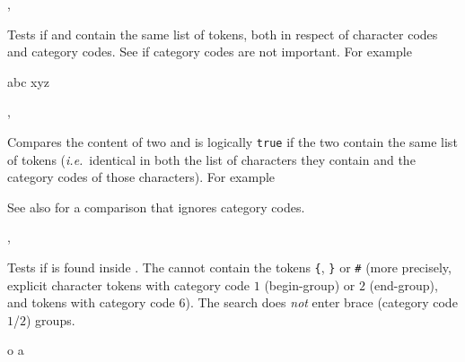 \documentclass[oneside]{book}
\begin{document}
\begin{function}{\TlIfEq,\TlIfEqTF}
\begin{syntax}
  
    
\end{syntax}
Tests if  and  contain the
same list of tokens, both in respect of character codes and category
codes. See  if category codes are not important.
For example
\begin{demohigh}
 {abc} {} {}
 {xyz} {} {}
\end{demohigh}
\end{function}

\begin{function}{\TlVarIfEq,\TlVarIfEqTF}
\begin{syntax}
  
    
\end{syntax}
Compares the content of two  and
is logically \texttt{true} if the two contain the same list of
tokens (\emph{i.e.}~identical in both the list of characters they
contain and the category codes of those characters). For example
\begin{demohigh}
\TlSet {}
\TlSet {}
\TlSet {}
\TlVarIfEqTF \lTmpaTl {} {}
\TlVarIfEqTF \lTmpaTl {} {}
\end{demohigh}
See also  for a comparison that ignores category codes.
\end{function}

\begin{function}{\TlIfIn,\TlIfInTF}
\begin{syntax}
  
    
\end{syntax}
Tests if  is found inside .
The  cannot contain the tokens \verb|{|, \verb|}| or \verb|#|
(more precisely, explicit character tokens with category code $1$
(begin-group) or $2$ (end-group), and tokens with category code $6$).
The search does \emph{not} enter brace (category code $1$/$2$) groups.
\begin{demohigh}
 {o} {} {}
 {a} {} {}
\end{demohigh}
\end{function}
\end{document}
